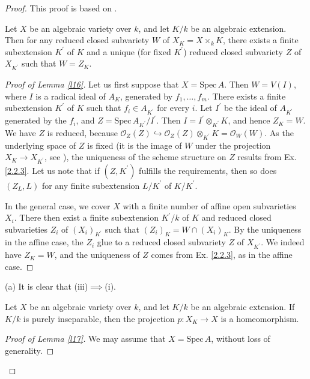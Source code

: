 \begin{proof}
	This proof is based on \cite[P. 89-91]{LIU}.
	\begin{lm}
		\label{l16}
		Let $X$ be an algebraic variety over $k$, and let $K/k$ be an algebraic extension. Then for any reduced closed subvariety $W$ of $X_K=X\times_kK$, there exists a finite subextension $K^{\prime}$ of $K$ and a unique (for fixed $K^{\prime}$) reduced closed subvariety $Z$ of $X_{K^{\prime}}$ such that $W=Z_K$.
	\end{lm}
	\begin{proof}[Proof of Lemma \ref{l16}]
		Let us first suppose that $X=\mathrm{Spec}\,A$. Then $W=V(I)$, where $I$ is a radical ideal of $A_K$, generated by $f_1,\dots,f_m$. There exists a finite subextension $K^{\prime}$ of $K$ such that $f_i\in A_{K^{\prime}}$ for every $i$. Let $I^{\prime}$ be the ideal of $A_{K^{\prime}}$ generated by the $f_i$, and $Z=\mathrm{Spec}\,A_{K^{\prime}}/I^{\prime}$. Then $I=I^{\prime}\otimes_{K^{\prime}}K$, and hence $Z_K=W$. We have $Z$ is reduced, because $\mathcal{O}_Z(Z)\hookrightarrow\mathcal{O}_Z(Z)\otimes_{K^{\prime}}K=\mathcal{O}_W(W)$. As the underlying space of $Z$ is fixed (it is the image of $W$ under the projection $X_K\to X_{K^{\prime}}$, see \cite[Ch. 3, Ex. 1.8, P.86]{LIU}), the uniqueness of the scheme structure on $Z$ results from Ex. \ref{2.2.3}. Let us note that if $(Z,K^{\prime})$ fulfills the requirements, then so does $(Z_L,L)$ for any finite subextension $L/K^{\prime}$ of $K/K^{\prime}$.
		
		In the general case, we cover $X$ with a finite number of affine open subvarieties $X_i$. There then exist a finite subextension $K^{\prime}/k$ of $K$ and reduced closed subvarieties $Z_i$ of $(X_i)_{K^{\prime}}$ such that $(Z_i)_K=W\cap(X_i)_K$. By the uniqueness in the affine case, the $Z_i$ glue to a reduced closed subvariety $Z$ of $X_{K^{\prime}}$. We indeed have $Z_K=W$, and the uniqueness of $Z$ comes from Ex. \ref{2.2.3}, as in the affine case.
	\end{proof}
	(a) It is clear that (iii)$\implies$(i).
	\begin{lm}
		\label{l17}
		Let $X$ be an algebraic variety over $k$, and let $K/k$ be an algebraic extension. If $K/k$ is purely inseparable, then the projection $p:X_K\to X$ is a homeomorphism.
	\end{lm}
	\begin{proof}[Proof of Lemma \ref{l17}]
		We may assume that $X=\mathrm{Spec}\,A$, without loss of generality. 
		

\end{proof}
\end{proof}
